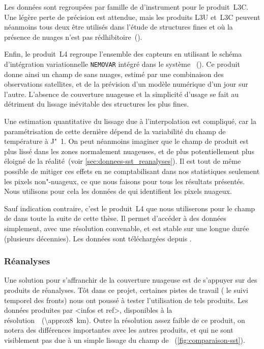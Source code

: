Les données sont regroupées par famille de d'instrument pour le produit~L3C. Une légère perte de précision est attendue, mais les produits L3U et~L3C peuvent néanmoins tous deux être utilisés dans l'étude de structures fines et où la présence de nuages n'est pas rédhibitoire~(\cite{merchant_2019}).

Enfin, le produit~L4 regroupe l'ensemble des capteurs en utilisant le schéma d'intégration variationnelle \verb|NEMOVAR| intégré dans le système ~(\cite{good_2020}).
Ce produit donne ainsi un champ de  sans nuages, estimé par une combinaison des observations satellites, et de la prévision d'un modèle numérique d'un jour sur l'autre.
L'absence de couverture nuageuse et la simplicité d'usage se fait au détriment du lissage inévitable des structures les plus fines.

Une estimation quantitative du lissage due à l'interpolation est compliqué, car la paramétrisation de cette dernière dépend de la variabilité du champ de température à J"~1.
On peut néanmoins imaginer que le champ de  produit est plus lissé dans les zones normalement nuageuses, et de plus potentiellement plus éloigné de la réalité~(voir \cref{sec:donnees-sst_reanalyses}).
Il est tout de même possible de mitiger ces effets en ne comptabilisant dans nos statistiques seulement les pixels non"-nuageux, ce que nous faisons pour tous les résultats présentés.
Nous utilisons pour cela les données de  qui identifient les pixels nuageux.

Sauf indication contraire, c'est le produit~L4 que nous utiliserons pour le champ de  dans toute la suite de cette thèse.
Il permet d'accéder à des données  simplement, avec une résolution convenable, et est stable sur une longue durée (plusieurs décennies).
Les données sont téléchargées depuis .

\subsubsection{Réanalyses}

Une solution pour s'affranchir de la couverture nuageuse est de s'appuyer sur des produits de réanalyses.
Tôt dans ce projet, certaines pistes de travail ( le suivi temporel des fronts) nous ont poussé à tester l'utilisation de tels produits.
Les données produites par <infos et ref>, disponibles à la résolution~~(\qty{\approx8}{\km}).
Outre la résolution assez faible de ce produit, on notera des différences importantes avec les autres produits, et qui ne sont visiblement pas due à un simple lissage du champ de ~(\cref{fig:comparaison-sst}).

